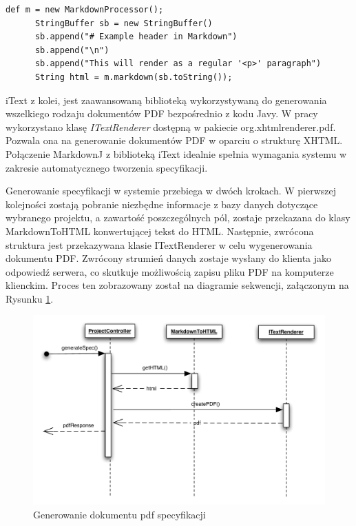       \begin{lstlisting}[caption={Wykorzystanie klasy MarkdownProcessor}, label={lst:markdownProc}]
      def m = new MarkdownProcessor(); 
      StringBuffer sb = new StringBuffer()
      sb.append("# Example header in Markdown")
      sb.append("\n")
      sb.append("This will render as a regular '<p>' paragraph")
      String html = m.markdown(sb.toString()); 
      \end{lstlisting}

      iText z kolei, jest zaawansowaną biblioteką wykorzystywaną do generowania wszelkiego rodzaju dokumentów PDF bezpośrednio z kodu Javy. W pracy wykorzystano klasę \emph{ITextRenderer} dostępną w pakiecie org.xhtmlrenderer.pdf. Pozwala ona na generowanie dokumentów PDF w oparciu o strukturę XHTML. Połączenie MarkdownJ z biblioteką iText idealnie spełnia wymagania systemu w zakresie automatycznego tworzenia specyfikacji.

      Generowanie specyfikacji w systemie przebiega w dwóch krokach. W pierwszej kolejności zostają pobranie niezbędne informacje z bazy danych dotyczące wybranego projektu, a zawartość poszczególnych pól, zostaje przekazana do klasy MarkdownToHTML konwertującej tekst do HTML. Następnie, zwrócona struktura jest przekazywana klasie ITextRenderer w celu wygenerowania dokumentu PDF. Zwrócony strumień danych zostaje wysłany do klienta jako odpowiedź serwera, co skutkuje możliwością zapisu pliku PDF na komputerze klienckim. Proces ten zobrazowany został na diagramie sekwencji, załączonym na Rysunku \ref{fig:seq}.

      \begin{figure}[t]
        \centering
        \includegraphics[width=1.0\textwidth]{img/seq.pdf}
        \caption{Generowanie dokumentu pdf specyfikacji}
        \label{fig:seq}
      \end{figure}

